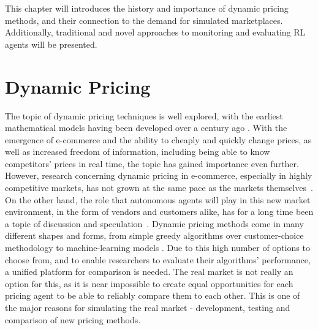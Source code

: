 \begin{jointwork}\label{ch:RelatedWork}
	This chapter will introduces the history and importance of dynamic pricing methods, and their connection to the demand for simulated marketplaces. Additionally, traditional and novel approaches to monitoring and evaluating RL agents will be presented.
\end{jointwork}

\section{Dynamic Pricing}

The topic of dynamic pricing techniques is well explored, with the earliest mathematical models having been developed over a century ago \cite{DynamicPricingHistory}. With the emergence of e-commerce and the ability to cheaply and quickly change prices, as well as increased freedom of information, including being able to know competitors' prices in real time, the topic has gained importance even further. However, research concerning dynamic pricing in e-commerce, especially in highly competitive markets, has not grown at the same pace as the markets themselves~\cite{PricingEcommerceGrowth}. On the other hand, the role that autonomous agents will play in this new market environment, in the form of vendors and customers alike, has for a long time been a topic of discussion and speculation~\cite{PricingBySoftwareAgents}. Dynamic pricing methods come in many different shapes and forms, from simple greedy algorithms over customer-choice methodology to machine-learning models \cite{deGeerPricing}. Due to this high number of options to choose from, and to enable researchers to evaluate their algorithms' performance, a unified platform for comparison is needed. The real market is not really an option for this, as it is near impossible to create equal opportunities for each pricing agent to be able to reliably compare them to each other. This is one of the major reasons for simulating the real market - development, testing and comparison of new pricing methods.

